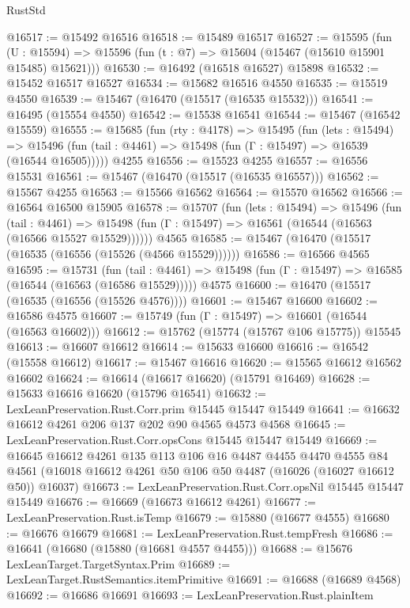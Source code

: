 \begin{lexlean}{RustStd}
\begin{coremodule}
@16517 := @15492 @16516
@16518 := @15489 @16517
@16527 := @15595
    (fun (U : @15594) => @15596 (fun (t : @7) => @15604 (@15467 (@15610 @15901 @15485) @15621)))
@16530 := @16492 (@16518 @16527) @15898
@16532 := @15452 @16517 @16527
@16534 := @15682 @16516 @4550
@16535 := @15519 @4550
@16539 := @15467 (@16470 (@15517 (@16535 @15532)))
@16541 := @16495 (@15554 @4550)
@16542 := @15538 @16541
@16544 := @15467 (@16542 @15559)
@16555 := @15685
    (fun (rty : @4178) =>
    @15495
      (fun (lets : @15494) =>
      @15496 (fun (tail : @4461) => @15498 (fun (Γ : @15497) => @16539 (@16544 @16505)))))
    @4255
@16556 := @15523 @4255
@16557 := @16556 @15531
@16561 := @15467 (@16470 (@15517 (@16535 @16557)))
@16562 := @15567 @4255
@16563 := @15566 @16562
@16564 := @15570 @16562
@16566 := @16564 @16500 @15905
@16578 := @15707
    (fun (lets : @15494) =>
    @15496
      (fun (tail : @4461) =>
      @15498 (fun (Γ : @15497) => @16561 (@16544 (@16563 (@16566 @15527 @15529))))))
    @4565
@16585 := @15467 (@16470 (@15517 (@16535 (@16556 (@15526 (@4566 @15529))))))
@16586 := @16566 @4565
@16595 := @15731
    (fun (tail : @4461) => @15498 (fun (Γ : @15497) => @16585 (@16544 (@16563 (@16586 @15529)))))
    @4575
@16600 := @16470 (@15517 (@16535 (@16556 (@15526 @4576))))
@16601 := @15467 @16600
@16602 := @16586 @4575
@16607 := @15749 (fun (Γ : @15497) => @16601 (@16544 (@16563 @16602)))
@16612 := @15762 (@15774 (@15767 @106 @15775)) @15545
@16613 := @16607 @16612
@16614 := @15633 @16600
@16616 := @16542 (@15558 @16612)
@16617 := @15467 @16616
@16620 := @15565 @16612 @16562 @16602
@16624 := @16614 (@16617 @16620) (@15791 @16469)
@16628 := @15633 @16616 @16620 (@15796 @16541)
@16632 := LexLeanPreservation.Rust.Corr.prim @15445 @15447 @15449
@16641 := @16632 @16612 @4261 @206 @137 @202 @90 @4565 @4573 @4568
@16645 := LexLeanPreservation.Rust.Corr.opsCons @15445 @15447 @15449
@16669 := @16645
    @16612
    @4261
    @135
    @113
    @106
    @16
    @4487
    @4455
    @4470
    @4555
    @84
    @4561
    (@16018 @16612 @4261 @50 @106 @50 @4487 (@16026 (@16027 @16612 @50)) @16037)
@16673 := LexLeanPreservation.Rust.Corr.opsNil @15445 @15447 @15449
@16676 := @16669 (@16673 @16612 @4261)
@16677 := LexLeanPreservation.Rust.isTemp
@16679 := @15880 (@16677 @4555)
@16680 := @16676 @16679
@16681 := LexLeanPreservation.Rust.tempFresh
@16686 := @16641 (@16680 (@15880 (@16681 @4557 @4455)))
@16688 := @15676 LexLeanTarget.TargetSyntax.Prim
@16689 := LexLeanTarget.RustSemantics.itemPrimitive
@16691 := @16688 (@16689 @4568)
@16692 := @16686 @16691
@16693 := LexLeanPreservation.Rust.plainItem

\end{coremodule}
\end{lexlean}
